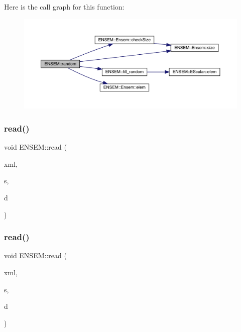 Here is the call graph for this function\+:\nopagebreak
\begin{figure}[H]
\begin{center}
\leavevmode
\includegraphics[width=350pt]{d2/d94/namespaceENSEM_a7e217f3d73216cb71b6221611387c805_cgraph}
\end{center}
\end{figure}
\mbox{\label{namespaceENSEM_a59df78af1e673ccefd2496b40ffcebac}} 
\subsubsection{\texorpdfstring{read()}{read()}\hspace{0.1cm}{\footnotesize\ttfamily [1/11]}}
{\footnotesize\ttfamily void E\+N\+S\+E\+M\+::read (\begin{DoxyParamCaption}\item[{\mbox{\hyperlink{classADATXML_1_1XMLReader}{A\+D\+A\+T\+X\+M\+L\+::\+X\+M\+L\+Reader}} \&}]{xml,  }\item[{const std\+::string \&}]{s,  }\item[{\mbox{\hyperlink{classXMLArray_1_1Array}{Array}}$<$ \mbox{\hyperlink{group__defs_gab13d060149cdd80ab40fd8d653f60117}{Integer}} $>$ \&}]{d }\end{DoxyParamCaption})}

\mbox{\label{namespaceENSEM_a35ede464f1c4210bc6236f281a40ee73}} 
\subsubsection{\texorpdfstring{read()}{read()}\hspace{0.1cm}{\footnotesize\ttfamily [2/11]}}
{\footnotesize\ttfamily void E\+N\+S\+E\+M\+::read (\begin{DoxyParamCaption}\item[{\mbox{\hyperlink{classADATXML_1_1XMLReader}{A\+D\+A\+T\+X\+M\+L\+::\+X\+M\+L\+Reader}} \&}]{xml,  }\item[{const std\+::string \&}]{s,  }\item[{\mbox{\hyperlink{classXMLArray_1_1Array}{Array}}$<$ \mbox{\hyperlink{group__defs_gab601f1c55eb75baed0a0859b3fec6bc1}{Real32}} $>$ \&}]{d }\end{DoxyParamCaption})}

